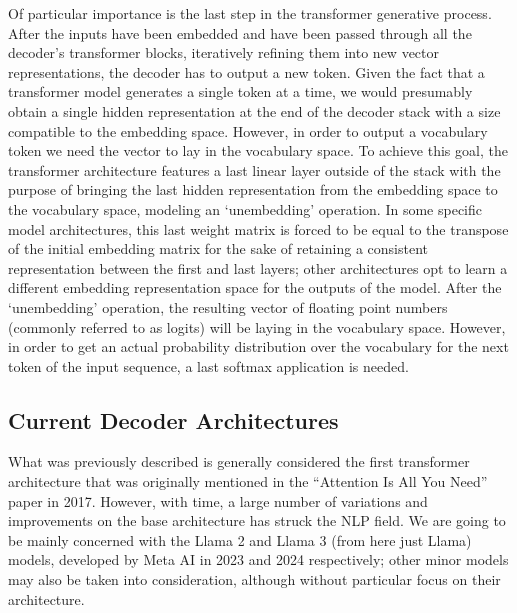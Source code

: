 Of particular importance is the last step in the transformer generative process.
After the inputs have been embedded and have been passed through all the decoder's transformer blocks, iteratively refining them into new vector representations, the decoder has to output a new token.
Given the fact that a transformer model generates a single token at a time, we would presumably obtain a single hidden representation at the end of the decoder stack with a size compatible to the embedding space.
However, in order to output a vocabulary token we need the vector to lay in the vocabulary space.
To achieve this goal, the transformer architecture features a last linear layer outside of the stack with the purpose of bringing the last hidden representation from the embedding space to the vocabulary space, modeling an `unembedding' operation.
In some specific model architectures, this last weight matrix is forced to be equal to the transpose of the initial embedding matrix for the sake of retaining a consistent representation between the first and last layers; other architectures opt to learn a different embedding representation space for the outputs of the model.
After the `unembedding' operation, the resulting vector of floating point numbers (commonly referred to as logits) will be laying in the vocabulary space.
However, in order to get an actual probability distribution over the vocabulary for the next token of the input sequence, a last softmax application is needed.

\subsection{Current Decoder Architectures}

What was previously described is generally considered the first transformer architecture that was originally mentioned in the ``Attention Is All You Need'' \cite{vaswani2017} paper in 2017.
However, with time, a large number of variations and improvements on the base architecture has struck the NLP field.
We are going to be mainly concerned with the Llama 2  and Llama 3  (from here just Llama) models, developed by Meta AI  in 2023 and 2024 respectively; other minor models may also be taken into consideration, although without particular focus on their architecture.


